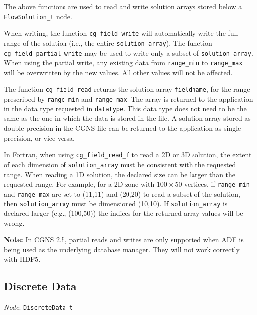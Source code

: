 The above functions are used to read and write solution arrays stored
below a \texttt{FlowSolution\_t} node.

When writing, the function \texttt{cg\_field\_write} will
automatically write the full range of the solution (i.e., the entire
\texttt{solution\_array}).
The function \texttt{cg\_field\_partial\_write} may be used to write
only a subset of \texttt{solution\_array}.
When using the partial write, any existing data from \texttt{range\_min}
to \texttt{range\_max} will be overwritten by the new values.
All other values will not be affected.

The function \texttt{cg\_field\_read} returns the solution array
\texttt{fieldname}, for the range prescribed by \texttt{range\_min} and
\texttt{range\_max}.
The array is returned to the application in the data type requested in
\texttt{datatype}.
This data type does not need to be the same as the one in which the data is
stored in the file.
A solution array stored as double precision in the CGNS file can be
returned to the application as single precision, or vice versa.

In Fortran, when using \texttt{cg\_field\_read\_f} to read a 2D or 3D
solution, the extent of each dimension of \texttt{solution\_array} must
be consistent with the requested range.
When reading a 1D solution, the declared size can be larger than the
requested range.
For example, for a 2D zone with $100 \times 50$ vertices, if
\texttt{range\_min} and \texttt{range\_max} are set to (11,11) and (20,20)
to read a subset of the solution, then \texttt{solution\_array} must be
dimensioned (10,10).
If \texttt{solution\_array} is declared larger (e.g., (100,50)) the
indices for the returned array values will be wrong.

\noindent
\textbf{Note:} In CGNS 2.5, partial reads and writes are only supported
when ADF is being used as the underlying database manager.
They will not work correctly with HDF5.

\subsection{Discrete Data}
\label{s:discretedata}

\noindent
\textit{Node}: \texttt{DiscreteData\_t}

